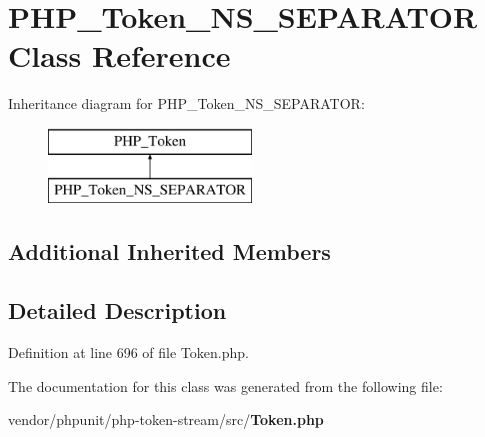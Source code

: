 \section{P\+H\+P\+\_\+\+Token\+\_\+\+N\+S\+\_\+\+S\+E\+P\+A\+R\+A\+T\+O\+R Class Reference}
\label{class_p_h_p___token___n_s___s_e_p_a_r_a_t_o_r}
Inheritance diagram for P\+H\+P\+\_\+\+Token\+\_\+\+N\+S\+\_\+\+S\+E\+P\+A\+R\+A\+T\+O\+R\+:\begin{figure}[H]
\begin{center}
\leavevmode
\includegraphics[height=2.000000cm]{class_p_h_p___token___n_s___s_e_p_a_r_a_t_o_r}
\end{center}
\end{figure}
\subsection*{Additional Inherited Members}


\subsection{Detailed Description}


Definition at line 696 of file Token.\+php.



The documentation for this class was generated from the following file\+:\begin{DoxyCompactItemize}
\item 
vendor/phpunit/php-\/token-\/stream/src/{\bf Token.\+php}\end{DoxyCompactItemize}
